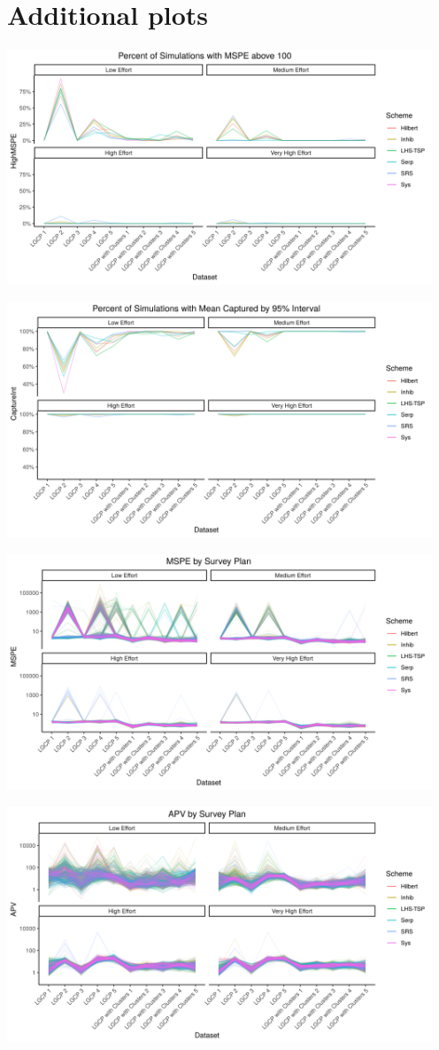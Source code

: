 \documentclass[review]{elsarticle}
\begin{document}
\appendix
\section{Additional plots}

\includegraphics[width=5in]{../graphics/HighMSPE-profile.png}

\includegraphics[width=5in]{../graphics/IntCapture-profile.png}

\includegraphics[width=5in]{../graphics/MSPE-profile.png}

\includegraphics[width=5in]{../graphics/APV-profile.png}
\end{document}

